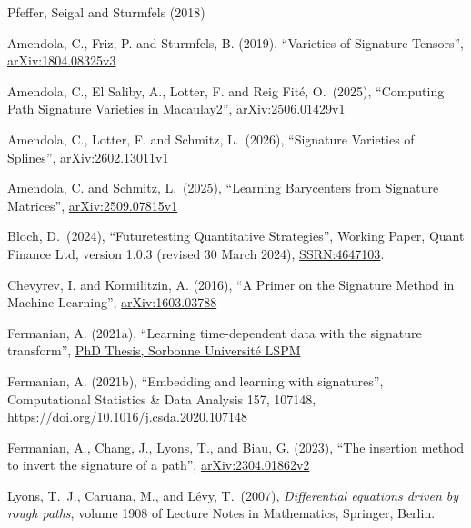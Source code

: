 \documentclass[12pt,english]{article}
\theoremstyle{remark}
\begin{document}
\begin{thebibliography}{Pfeffer, Seigal and Sturmfels (2018)}

Amendola, C.,
Friz, P. and Sturmfels, B. (2019), ``Varieties of Signature Tensors'',
\href{https://arxiv.org/abs/1804.08325v3}{arXiv:1804.08325v3}

Amendola, C., El Saliby, A.,
Lotter, F. and Reig Fité, O.\ (2025), ``Computing Path Signature Varieties
in Macaulay2'',
\href{https://arxiv.org/abs/2506.01429v1}{arXiv:2506.01429v1}

Amendola, C.,
Lotter, F. and Schmitz, L.\ (2026), ``Signature Varieties of Splines'',
\href{https://arxiv.org/abs/2602.13011v1}{arXiv:2602.13011v1}

Amendola, C. and
Schmitz, L.\ (2025), ``Learning Barycenters from Signature Matrices'',
\href{https://arxiv.org/abs/2509.07815v1}{arXiv:2509.07815v1}

Bloch, D.\ (2024),
``Futuretesting Quantitative Strategies'', Working Paper, Quant
Finance Ltd, version 1.0.3 (revised 30 March 2024),
\href{https://papers.ssrn.com/sol3/papers.cfm?abstract_id=4647103}{SSRN:4647103}.

Chevyrev, I. and Kormilitzin, A.
(2016), ``A Primer on the Signature Method in Machine Learning'',
\href{https://arxiv.org/abs/1603.03788}{arXiv:1603.03788}

Fermanian, A. (2021a),
``Learning time-dependent data with the signature transform'',
\href{https://theses.hal.science/tel-03507274}{PhD Thesis, Sorbonne Université LSPM}

Fermanian, A. (2021b),
``Embedding and learning with signatures'', Computational Statistics
\& Data Analysis 157, 107148,
\href{https://doi.org/10.1016/j.csda.2020.107148}{https://doi.org/10.1016/j.csda.2020.107148}

Fermanian, A., Chang, J.,
Lyons, T., and Biau, G. (2023), ``The insertion method to invert the
signature of a path'', \href{https://arxiv.org/abs/2304.01862v2}{arXiv:2304.01862v2}

Lyons, T.~J., Caruana, M.,
and Lévy, T.\ (2007), \emph{Differential equations driven by rough paths},
volume 1908 of Lecture Notes in Mathematics, Springer, Berlin.


\end{thebibliography}
\end{document}
